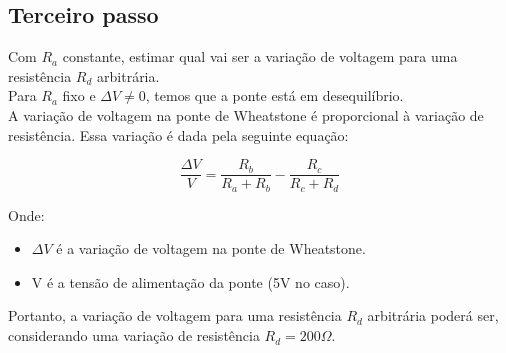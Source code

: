 \documentclass[a4paper, 12pt]{article}
\begin{document}








\newpage
\subsection{Terceiro passo}
 Com $R_a$ constante, estimar qual vai ser a variação de voltagem para uma resistência $R_d$ arbitrária.\\

Para $R_a$ fixo e $\Delta V \neq 0$, temos que a ponte está em desequilíbrio.\\

A variação de voltagem na ponte de Wheatstone é proporcional à variação de resistência. Essa variação é dada pela seguinte equação:

\begin{equation*}
    \frac{\Delta V}{V} = \frac{R_b}{R_a + R_b} - \frac{R_c}{R_c + R_d}
\end{equation*}


Onde:
\begin{itemize}
    \item $\Delta V$ é a variação de voltagem na ponte de Wheatstone.
    \item V é a tensão de alimentação da ponte (5V no  caso).

\end{itemize}



Portanto, a variação de voltagem para uma resistência $R_d$ arbitrária poderá ser, considerando uma variação de resistência  $ R_d = 200 \Omega $.\\ \\
\end{document}
